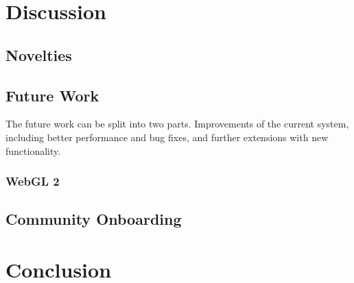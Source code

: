 \section{Discussion}

\subsection{Novelties}


\subsection{Future Work}
The future work can be split into two parts. Improvements of the current system,
including better performance and bug fixes, and further extensions with new functionality.

\subsubsection{WebGL 2}\label{sec_futureGL}


\subsection{Community Onboarding}



\section{Conclusion}
